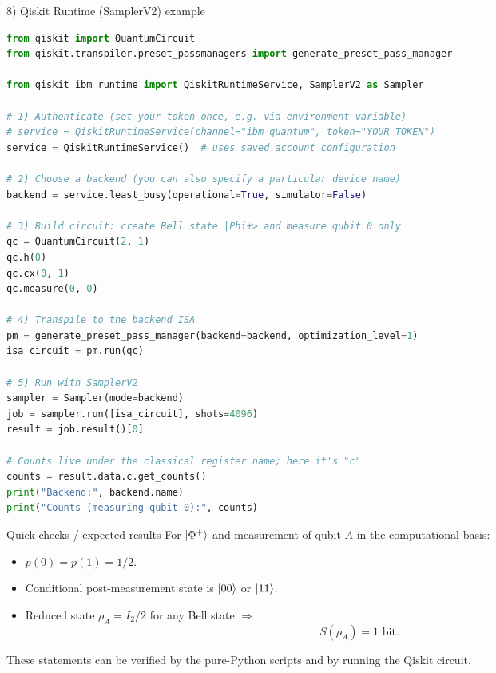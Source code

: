 \documentclass[aspectratio=169]{beamer}
\begin{document}
\begin{frame}[fragile]{8) Qiskit Runtime (SamplerV2) example}
\begin{lstlisting}[language=Python]
from qiskit import QuantumCircuit
from qiskit.transpiler.preset_passmanagers import generate_preset_pass_manager

from qiskit_ibm_runtime import QiskitRuntimeService, SamplerV2 as Sampler

# 1) Authenticate (set your token once, e.g. via environment variable)
# service = QiskitRuntimeService(channel="ibm_quantum", token="YOUR_TOKEN")
service = QiskitRuntimeService()  # uses saved account configuration

# 2) Choose a backend (you can also specify a particular device name)
backend = service.least_busy(operational=True, simulator=False)

# 3) Build circuit: create Bell state |Phi+> and measure qubit 0 only
qc = QuantumCircuit(2, 1)
qc.h(0)
qc.cx(0, 1)
qc.measure(0, 0)

# 4) Transpile to the backend ISA
pm = generate_preset_pass_manager(backend=backend, optimization_level=1)
isa_circuit = pm.run(qc)

# 5) Run with SamplerV2
sampler = Sampler(mode=backend)
job = sampler.run([isa_circuit], shots=4096)
result = job.result()[0]

# Counts live under the classical register name; here it's "c"
counts = result.data.c.get_counts()
print("Backend:", backend.name)
print("Counts (measuring qubit 0):", counts)
\end{lstlisting}
\end{frame}

\begin{frame}{Quick checks / expected results}
For $\ket{\Phi^+}$ and measurement of qubit $A$ in the computational basis:

\begin{itemize}
\item $p(0)=p(1)=1/2$.
\item Conditional post-measurement state is $\ket{00}$ or $\ket{11}$.
\item Reduced state $\rho_A=I_2/2$ for any Bell state $\Rightarrow$
\[
S(\rho_A)=1 \text{ bit}.
\]
\end{itemize}

\medskip
These statements can be verified by the pure-Python scripts and by running the Qiskit circuit.
\end{frame}
\end{document}
